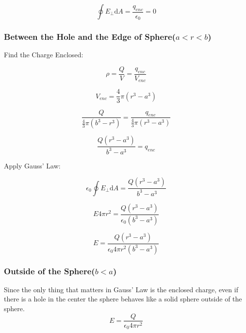 \documentclass[a4paper,12pt]{article}
\begin{document}
						\begin{equation*}
							\oint E_{\bot} \mathrm{d}A = \frac{q_{enc}}{\epsilon_{0}} = 0
						\end{equation*}

					\subsubsection{Between the Hole and the Edge of Sphere($a < r < b$)}

						Find the Charge Enclosed:

						\begin{equation*}
								\rho = \frac{Q}{V} = \frac{q_{enc}}{V_{enc}}
						\end{equation*}

						\begin{equation*}
								V_{enc} = \frac{4}{3} \pi (r^{3} - a^{3}) 
						\end{equation*}

						\begin{equation*}
								\frac{Q}{\frac{4}{3} \pi (b^{3} - r^{3})} = \frac{q_{enc}}{\frac{4}{3} \pi (r^{3} - a^{3})} 
						\end{equation*}

						\begin{equation*}
								\frac{Q(r^{3} - a^{3})}{b^{3} - a^{3}} = q_{enc}
						\end{equation*}

						Apply Gauss' Law:

						\begin{equation*}
								\epsilon_{0} \oint E_{\bot} \mathrm{d}A = \frac{Q(r^{3} - a^{3})}{b^{3} - a^{3}}
						\end{equation*}
						
						\begin{equation*}
								E 4 \pi r^{2} = \frac{Q(r^{3} - a^{3})}{\epsilon_{0} (b^{3} - a^{3})}
						\end{equation*}

						\begin{equation*}
								E = \frac{Q(r^{3} - a^{3})}{\epsilon_{0} 4 \pi r^{2} (b^{3} - a^{3})}
						\end{equation*}
					\subsubsection{Outside of the Sphere($b < a$)}
						Since the only thing that matters in Gauss' Law is the enclosed charge, even if there is a hole in the center the sphere behaves like a solid sphere outside of the sphere.
						\begin{equation*}
								E = \frac{Q}{\epsilon_{0} 4 \pi r^{2}} 
						\end{equation*}
\end{document}
